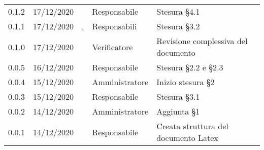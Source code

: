 {\begin{longtable}{c C{2.6cm} C{3cm} C{3cm} C{5cm}}
0.1.2 & 17/12/2020 & \SG{} & Responsabile & Stesura \S 4.1 \\

0.1.1 & 17/12/2020 & \SG{},\newline \BM{} & Responsabili & Stesura \S 3.2 \\

0.1.0 & 17/12/2020 & \ZM{} & Verificatore & Revisione complessiva del documento \\

0.0.5 & 16/12/2020 & \BM{} & Responsabile & Stesura \S 2.2 e \S 2.3 \\
		
0.0.4 & 15/12/2020 & \PA{} & Amministratore & Inizio stesura \S 2 \\

0.0.3 & 15/12/2020 & \SG{} & Responsabile & Stesura \S 3.1 \\

0.0.2 & 14/12/2020 & \PA{} & Amministratore & Aggiunta \S 1 \\

0.0.1 & 14/12/2020 & \SG{} & Responsabile & Creata struttura del documento Latex \\
		
\end{longtable}
}

